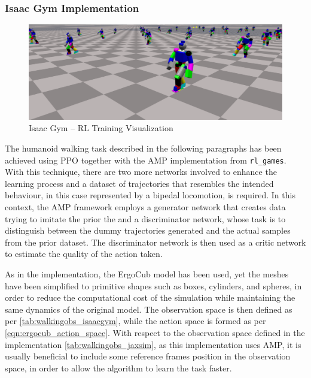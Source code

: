\subsubsection{Isaac Gym Implementation}

\begin{figure}
    \centering
    \caption{Isaac Gym -- RL Training Visualization}
    \label{fig:isaacgymtraining}
    \includegraphics[width=.9\textwidth]{Images/stickbot_training_1.png}
\end{figure}

The humanoid walking task described in the following paragraphs has been achieved using \ac{PPO} together with the \ac{AMP} implementation from \texttt{rl\_games}. With this technique, there are two more networks involved to enhance the learning process and a dataset of trajectories that resembles the intended behaviour, in this case represented by a bipedal locomotion, is required. In this context, the AMP framework employs a generator network that creates data trying to imitate the prior the and a discriminator network, whose task is to distinguish between the dummy trajectories generated and the actual samples from the prior dataset. The discriminator network is then used as a critic network to estimate the quality of the action taken.

As in the \jaxsim implementation, the ErgoCub model has been used, yet the meshes have been simplified to primitive shapes such as boxes, cylinders, and spheres, in order to reduce the computational cost of the simulation while maintaining the same dynamics of the original model. The observation space is then defined as per \cref{tab:walkingobs_isaacgym}, while the action space is formed as per \cref{eqn:ergocub_action_space}. With respect to the observation space defined in the \jaxsim implementation \cref{tab:walkingobs_jaxsim}, as this implementation uses \ac{AMP}, it is usually beneficial to include some reference frames position in the observation space, in order to allow the algorithm to learn the task faster.

